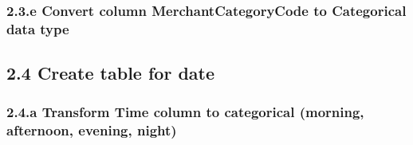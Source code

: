 \documentclass[
]{article}
\newenvironment{Shaded}{\begin{snugshade}}{\end{snugshade}}
\newcommand{\FunctionTok}[1]{\textcolor[rgb]{0.13,0.29,0.53}{\textbf{#1}}}
\newcommand{\NormalTok}[1]{#1}
\newcommand{\OtherTok}[1]{\textcolor[rgb]{0.56,0.35,0.01}{#1}}
\newcommand{\SpecialCharTok}[1]{\textcolor[rgb]{0.81,0.36,0.00}{\textbf{#1}}}
\begin{document}
\begin{Shaded}
\end{Shaded}

\subsubsection{2.3.e Convert column MerchantCategoryCode to Categorical
data
type}\label{e-convert-column-merchantcategorycode-to-categorical-data-type}

\begin{Shaded}
\end{Shaded}

\subsection{2.4 Create table for date}\label{create-table-for-date}

\subsubsection{2.4.a Transform Time column to categorical (morning,
afternoon, evening,
night)}\label{a-transform-time-column-to-categorical-morning-afternoon-evening-night}
\end{document}
